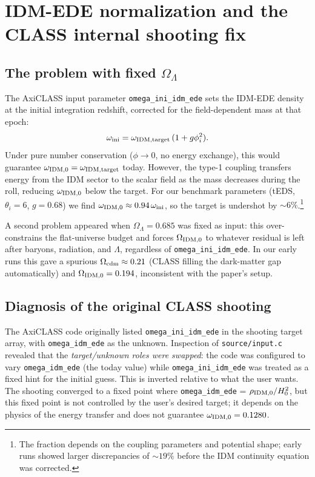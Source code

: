 \documentclass[aps,onecolumn,prd,nofootinbib,superscriptaddress,10pt,longbibliography,floatfix]{revtex4-2}
\begin{document}
\section{IDM-EDE normalization and the CLASS internal shooting fix}
\label{app:normalization}

\subsection{The problem with fixed $\Omega_\Lambda$}

The AxiCLASS input parameter \texttt{omega\_ini\_idm\_ede} sets the IDM-EDE density at the initial integration redshift, corrected for the field-dependent mass at that epoch:
\begin{equation}
\omega_{\rm ini} = \omega_{\rm IDM,target}\,(1 + g\phi_i^2).
\label{eq:omega-ini}
\end{equation}
Under pure number conservation ($\phi\to 0$, no energy exchange), this would guarantee $\omega_{\rm IDM,0}=\omega_{\rm IDM,target}$ today. However, the type-1 coupling transfers energy from the IDM sector to the scalar field as the mass decreases during the roll, reducing $\omega_{\rm IDM,0}$ below the target. For our benchmark parameters (tEDS, $\theta_i=6$, $g=0.68$) we find $\omega_{\rm IDM,0}\approx 0.94\,\omega_{\rm ini}$, so the target is undershot by $\sim 6\%$.\footnote{The fraction depends on the coupling parameters and potential shape; early runs showed larger discrepancies of $\sim 19\%$ before the IDM continuity equation was corrected.}

A second problem appeared when $\Omega_\Lambda=0.685$ was fixed as input: this over-constrains the flat-universe budget and forces $\Omega_{\rm IDM,0}$ to whatever residual is left after baryons, radiation, and $\Lambda$, regardless of \texttt{omega\_ini\_idm\_ede}. In our early runs this gave a spurious $\Omega_{\rm cdm}\approx 0.21$ (CLASS filling the dark-matter gap automatically) and $\Omega_{\rm IDM,0}=0.194$, inconsistent with the paper's setup.

\subsection{Diagnosis of the original CLASS shooting}

The AxiCLASS code originally listed \texttt{omega\_ini\_idm\_ede} in the shooting target array, with \texttt{omega\_idm\_ede} as the unknown. Inspection of \texttt{source/input.c} revealed that the \emph{target/unknown roles were swapped}: the code was configured to vary \texttt{omega\_idm\_ede} (the today value) while \texttt{omega\_ini\_idm\_ede} was treated as a fixed hint for the initial guess. This is inverted relative to what the user wants. The shooting converged to a fixed point where \texttt{omega\_idm\_ede} = $\rho_{\rm IDM,0}/H_0^2$, but this fixed point is not controlled by the user's desired target; it depends on the physics of the energy transfer and does not guarantee $\omega_{\rm IDM,0}=0.1280$.
\end{document}
